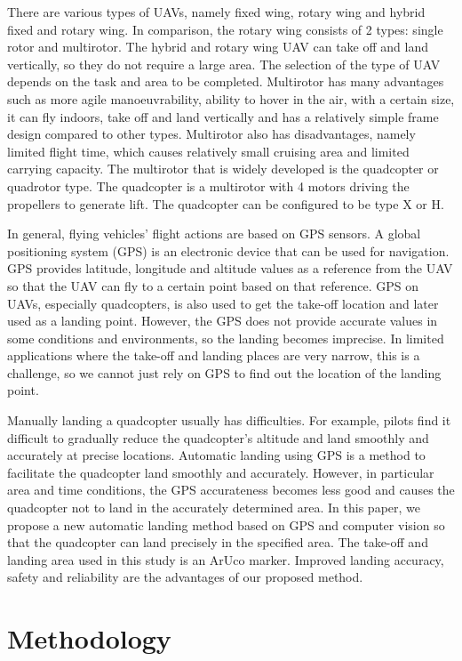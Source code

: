 \documentclass[a4paper]{jpconf}
\begin{document}
There are various types of UAVs, namely fixed wing, rotary wing and hybrid fixed and rotary wing. In comparison, the rotary wing consists of 2 types: single rotor and multirotor. The hybrid and rotary wing UAV can take off and land vertically, so they do not require a large area. The selection of the type of UAV depends on the task and area to be completed. Multirotor has many advantages such as more agile manoeuvrability, ability to hover in the air, with a certain size, it can fly indoors, take off and land vertically and has a relatively simple frame design compared to other types. Multirotor also has disadvantages, namely limited flight time, which causes relatively small cruising area and limited carrying capacity. The multirotor that is widely developed is the quadcopter or quadrotor type. The quadcopter is a multirotor with 4 motors driving the propellers to generate lift. The quadcopter can be configured to be type X or H.

In general, flying vehicles' flight actions are based on GPS sensors. A global positioning system (GPS) is an electronic device that can be used for navigation. GPS provides latitude, longitude and altitude values as a reference from the UAV so that the UAV can fly to a certain point based on that reference. GPS on UAVs, especially quadcopters, is also used to get the take-off location and later used as a landing point. However, the GPS does not provide accurate values in some conditions and environments, so the landing becomes imprecise. In limited applications where the take-off and landing places are very narrow, this is a challenge, so we cannot just rely on GPS to find out the location of the landing point.

Manually landing a quadcopter usually has difficulties. For example, pilots find it difficult to gradually reduce the quadcopter's altitude and land smoothly and accurately at precise locations. Automatic landing using GPS is a method to facilitate the quadcopter land smoothly and accurately. However, in particular area and time conditions, the GPS accurateness becomes less good and causes the quadcopter not to land in the accurately determined area\cite{ref4}. In this paper, we propose a new automatic landing method based on GPS and computer vision so that the quadcopter can land precisely in the specified area. The take-off and landing area used in this study is an ArUco marker. Improved landing accuracy, safety and reliability are the advantages of our proposed method.

\section{Methodology}
\end{document}
